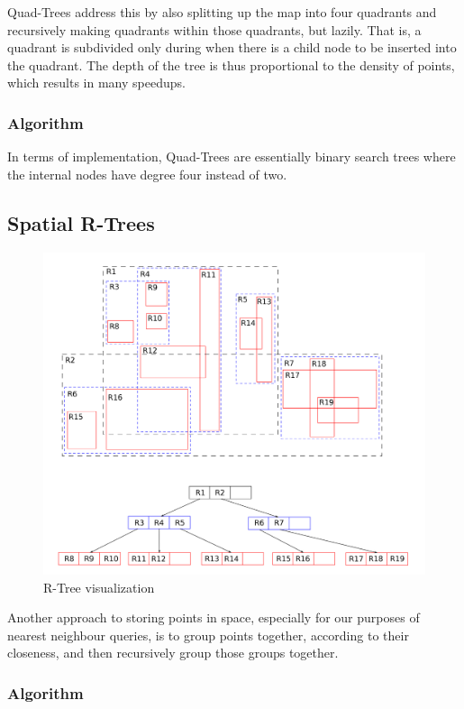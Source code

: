 \documentclass[12pt]{article}
\begin{document}
{Quad-Trees address this by also splitting up the map into four quadrants and recursively making quadrants within those quadrants, but lazily. That is, a quadrant is subdivided only during when there is a child node to be inserted into the quadrant. The depth of the tree is thus proportional to the density of points, which results in many speedups.

\subsubsection{Algorithm}

In terms of implementation, Quad-Trees are essentially binary search trees where the internal nodes have degree four instead of two. 

\subsection{Spatial R-Trees}

\begin{figure}
    \centering
    \includegraphics[scale=0.3]{../img/RTree.png}
    \caption{R-Tree visualization}
    \label{fig:my_label}
\end{figure}

Another approach to storing points in space, especially for our purposes of nearest neighbour queries, is to group points together, according to their closeness, and then recursively group those groups together. 

\subsubsection{Algorithm}



}
\end{document}
